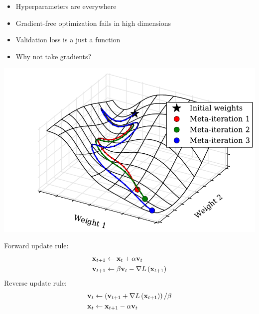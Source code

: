 \documentclass[landscape,a0b,final,a4resizeable]{include/a0poster}
\newcommand{\vv}{\mathbf{v}}
\begin{document}
\begin{poster}
\vspace*{2.5cm}

\large




\begin{multicols}{3}





\begin{itemize}
  \item Hyperparameters are everywhere
  \item Gradient-free optimization fails in high dimensions
  \item Validation loss is a just a function
  \item Why not take gradients?
\end{itemize}

\vspace{0.5in}


\includegraphics[width=0.5\columnwidth]{../talks/talkfigs/learning_curves_3.pdf}



Forward update rule:
\begin{align*}
\vx_{t+1} & \leftarrow \vx_t + \alpha \vv_t \\
\vv_{t+1} & \leftarrow \beta \vv_t - \nabla L\left(\vx_{t+1}\right)
\end{align*}
Reverse update rule:
\begin{align*}
\vv_{t} & \leftarrow \left(\vv_{t+1} + \nabla L\left(\vx_{t+1}\right)\right)/\beta \\
\vx_{t} & \leftarrow \vx_{t+1} - \alpha \vv_t
\end{align*}



\end{multicols}
\end{poster}
\end{document}
